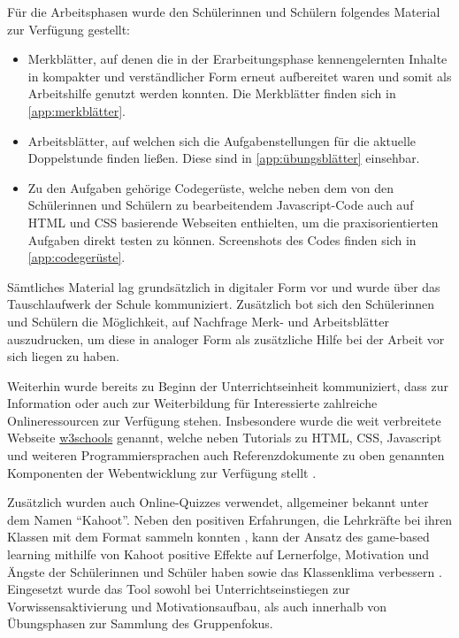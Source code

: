 Für die Arbeitsphasen wurde den Schülerinnen und Schülern folgendes Material zur Verfügung gestellt:
\begin{itemize}
	\item Merkblätter, auf denen die in der Erarbeitungsphase kennengelernten Inhalte in kompakter und verständlicher Form erneut aufbereitet waren und somit als Arbeitshilfe genutzt werden konnten.
	Die Merkblätter finden sich in \autoref{app:merkblätter}.
	\item Arbeitsblätter, auf welchen sich die Aufgabenstellungen für die aktuelle Doppelstunde finden ließen.
	Diese sind in \autoref{app:übungsblätter} einsehbar.
	\item Zu den Aufgaben gehörige Codegerüste, welche neben dem von den Schülerinnen und Schülern zu bearbeitendem Javascript-Code auch auf HTML und CSS basierende Webseiten enthielten, um die praxisorientierten Aufgaben direkt testen zu können.
	Screenshots des Codes finden sich in \autoref{app:codegerüste}.
\end{itemize}
Sämtliches Material lag grundsätzlich in digitaler Form vor und wurde über das Tauschlaufwerk der Schule kommuniziert.
Zusätzlich bot sich den Schülerinnen und Schülern die Möglichkeit, auf Nachfrage Merk- und Arbeitsblätter auszudrucken, um diese in analoger Form als zusätzliche Hilfe bei der Arbeit vor sich liegen zu haben.

Weiterhin wurde bereits zu Beginn der Unterrichtseinheit kommuniziert, dass zur Information oder auch zur Weiterbildung für Interessierte zahlreiche Onlineressourcen zur Verfügung stehen.
Insbesondere wurde die weit verbreitete Webseite \href{https://www.w3schools.com}{w3schools} genannt, welche neben Tutorials zu HTML, CSS, Javascript und weiteren Programmiersprachen auch Referenzdokumente zu oben genannten Komponenten der Webentwicklung zur Verfügung stellt \cite{w3schools}.

Zusätzlich wurden auch Online-Quizzes verwendet, allgemeiner bekannt unter dem Namen ``Kahoot''.
Neben den positiven Erfahrungen, die Lehrkräfte bei ihren Klassen mit dem Format sammeln konnten \cite{dellos2015kahoot}, kann der Ansatz des game-based learning mithilfe von Kahoot positive Effekte auf Lernerfolge, Motivation und Ängste der Schülerinnen und Schüler haben sowie das Klassenklima verbessern \cite{wang2020kahoot}.
Eingesetzt wurde das Tool sowohl bei Unterrichtseinstiegen zur Vorwissensaktivierung und Motivationsaufbau, als auch innerhalb von Übungsphasen zur Sammlung des Gruppenfokus.